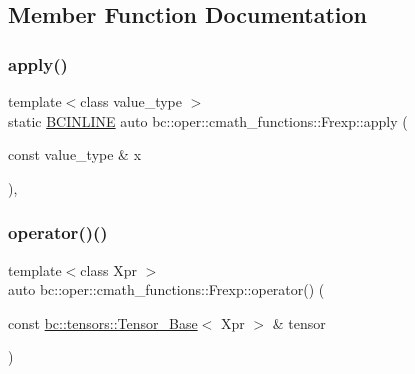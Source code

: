\subsection{Member Function Documentation}
\mbox{\label{structbc_1_1oper_1_1cmath__functions_1_1Frexp_a2cfad9ef9e2182294e091caa963cf721}} 
\subsubsection{\texorpdfstring{apply()}{apply()}}
{\footnotesize\ttfamily template$<$class value\+\_\+type $>$ \\
static \hyperlink{common_8h_a6699e8b0449da5c0fafb878e59c1d4b1}{B\+C\+I\+N\+L\+I\+NE} auto bc\+::oper\+::cmath\+\_\+functions\+::\+Frexp\+::apply (\begin{DoxyParamCaption}\item[{const value\+\_\+type \&}]{x }\end{DoxyParamCaption})\hspace{0.3cm}{\ttfamily [inline]}, {\ttfamily [static]}}

\mbox{\label{structbc_1_1oper_1_1cmath__functions_1_1Frexp_a4b62761222a4a64a1238068a62f51868}} 
\subsubsection{\texorpdfstring{operator()()}{operator()()}\hspace{0.1cm}{\footnotesize\ttfamily [1/3]}}
{\footnotesize\ttfamily template$<$class Xpr $>$ \\
auto bc\+::oper\+::cmath\+\_\+functions\+::\+Frexp\+::operator() (\begin{DoxyParamCaption}\item[{const \hyperlink{classbc_1_1tensors_1_1Tensor__Base}{bc\+::tensors\+::\+Tensor\+\_\+\+Base}$<$ Xpr $>$ \&}]{tensor }\end{DoxyParamCaption})\hspace{0.3cm}{\ttfamily [inline]}}

